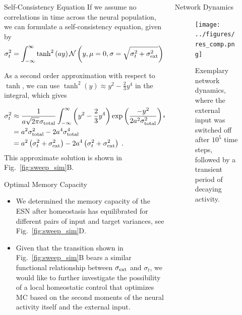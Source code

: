\documentclass{beamer}
\begin{document}
\begin{frame}[t]
\begin{columns}[t]
\begin{column}{.4\textwidth}
\begin{myblock}{Self-Consistency Equation}
	If we assume no correlations in time across the neural population, we can formulate a self-consistency equation, given by
	\begin{equation*}
	\sigma^2_{t} = \int_{-\infty}^{\infty}  \tanh^2\left(ay\right) \mathcal{N}\left(y, \mu = 0, \sigma = \sqrt{\sigma^2_{t} + \sigma^2_{\rm ext}}\right)	\mathrm{d}y \;. 
	\end{equation*}
	
	As a second order approximation with respect to $\tanh$, we can use $\tanh^2(y) \approx y^2 - \frac{2}{3} y^4$ in the integral, which gives
	
	\begin{align*}
	\sigma_{t}^2 &\approx \frac{1}{a\sqrt{2 \pi}\sigma_{\rm total}}\int_{-\infty}^{\infty}\left( y^2 - \frac{2}{3}y^4\right)\exp\left( \frac{-y^2}{2a^2\sigma_{\rm total}^2}\right) \mathrm{d}y \\
	&= a^2\sigma_{\rm total}^2 - 2a^4\sigma_{\rm total}^4 \\
	&= a^2\left( \sigma^2_{t} + \sigma^2_{\rm ext} \right) - 2a^4 \left( \sigma^2_{t} + \sigma^2_{\rm ext} \right) \; .
	\end{align*}
	This approximate solution is shown in Fig.~\ref{fig:sweep_sim}B.
\end{myblock}

\begin{myblock}{Optimal Memory Capacity}
	\begin{itemize}
		\item We determined the memory capacity of the ESN after homeostasis has equilibrated for different pairs of input and target variances, see Fig.~\ref{fig:sweep_sim}D.
		\item Given that the transition shown in Fig.~\ref{fig:sweep_sim}B bears a similar functional relationship between $\sigma_{\rm ext}$ and $\sigma_t$, we would like to further investigate the possibility of a local homeostatic control that optimizes MC based on the second moments of the neural activity itself and the external input. 
	\end{itemize}
\end{myblock}

\end{column}

\begin{column}{.55\textwidth}
\begin{myblock}{Network Dynamics}
	\begin{figure}
		\texttt{[image: ../figures/res\_comp.png]}
		\caption{Exemplary network dynamics, where the external input was switched off after $10^5$ time steps, followed by a transient period of decaying activity.}
		\label{fig:trans_dyn}
	\end{figure}
\end{myblock}	


\end{column}
\end{columns}
\end{frame}
\end{document}
